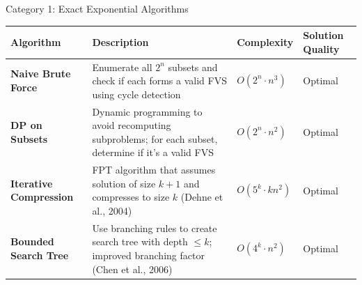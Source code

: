 \documentclass[aspectratio=169]{beamer}
\begin{document}
\begin{frame}{Category 1: Exact Exponential Algorithms}
	\begin{table}
		\tiny
		\begin{tabular}{@{}p{3.2cm}p{5cm}p{2.5cm}p{2cm}@{}}
			\toprule
			\textbf{Algorithm}                                                                                           & \textbf{Description} & \textbf{Complexity} & \textbf{Solution Quality} \\
			\midrule

			\textbf{Naive Brute Force}                                                                                   &
			Enumerate all $2^n$ subsets and check if each forms a valid FVS using cycle detection                        &
			$O(2^n \cdot n^3)$                                                                                           &
			Optimal                                                                                                                                                                               \\
			\midrule

			\textbf{DP on Subsets}                                                                                       &
			Dynamic programming to avoid recomputing subproblems; for each subset, determine if it's a valid FVS         &
			$O(2^n \cdot n^2)$                                                                                           &
			Optimal                                                                                                                                                                               \\
			\midrule

			\textbf{Iterative Compression}                                                                               &
			FPT algorithm that assumes solution of size $k+1$ and compresses to size $k$ (Dehne et al., 2004)            &
			$O(5^k \cdot kn^2)$                                                                                          &
			Optimal                                                                                                                                                                               \\
			\midrule

			\textbf{Bounded Search Tree}                                                                                 &
			Use branching rules to create search tree with depth $\leq k$; improved branching factor (Chen et al., 2006) &
			$O(4^k \cdot n^2)$                                                                                           &
			Optimal                                                                                                                                                                               \\
			\midrule


\end{tabular}
\end{table}
\end{frame}
\end{document}
